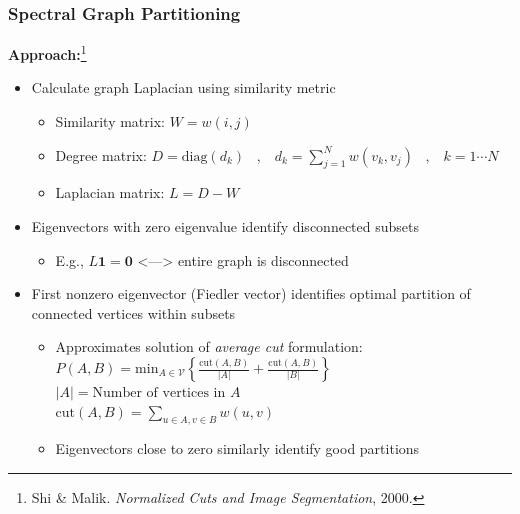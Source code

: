 \documentclass[9pt]{beamer}
\newcommand{\bv}[1]{\mathbf{#1}}
\begin{document}
\begin{frame}
\frametitle{Spectral Graph Partitioning}
\label{sec-3-5}

\textbf{Approach:}\footnote{Shi \& Malik. \emph{Normalized Cuts and Image Segmentation}, 2000.
 }
\begin{itemize}
\item Calculate graph Laplacian using similarity metric
\begin{itemize}
\item Similarity matrix: $W = w(i,j)$
\item Degree matrix: $D = \text{diag}(d_k) \;\;\; , \;\;\; d_k = \sum_{j=1}^N w(v_k,v_j) \;\;\; , \;\;\; k=1 \cdots N$
\item Laplacian matrix: $L = D - W$
\end{itemize}
\item Eigenvectors with zero eigenvalue identify disconnected subsets
\begin{itemize}
\item E.g., $L \bv{1} = \bv{0}$ <---> entire graph is disconnected
\end{itemize}
\item First nonzero eigenvector (Fiedler vector) identifies optimal
    partition of connected vertices within subsets
\begin{itemize}
\item Approximates solution of \emph{average cut} formulation: \\ 
$P(A,B) = \text{min}_{A \in \mathcal{V}} \left \lbrace \frac{\text{cut}(A,B)}{| A |} + \frac{\text{cut}(A,B)}{| B |} \right \rbrace$ \\
      $|A| = \text{Number of vertices in }A$ \\
      $\text{cut}(A,B) = \sum_{u \in A,v \in B} w(u,v)$
\item Eigenvectors close to zero similarly identify good partitions
\end{itemize}
\end{itemize}
\end{frame}
\end{document}
